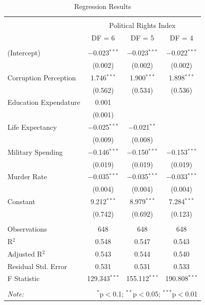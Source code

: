 \documentclass[
  english,
  man,floatsintext]{apa6}
\begin{document}
\begin{table}[!htbp] \centering 
  \caption{Regression Results} 
  \label{} 
\begin{tabular}{@{\extracolsep{5pt}}lccc} 
\\[-1.8ex]\hline 
\hline \\[-1.8ex] 
 & \multicolumn{3}{c}{Political Rights Index} \\ 
\cline{2-4} 
 & DF = 6 & DF = 5 & DF = 4 \\ 
\hline \\[-1.8ex] 
 (Intercept) & $-$0.023$^{***}$ & $-$0.023$^{***}$ & $-$0.022$^{***}$ \\ 
  & (0.002) & (0.002) & (0.002) \\ 
  Corruption Perception & 1.746$^{***}$ & 1.900$^{***}$ & 1.898$^{***}$ \\ 
  & (0.562) & (0.534) & (0.536) \\ 
  Education Expendature & 0.001 &  &  \\ 
  & (0.001) &  &  \\ 
  Life Expectancy & $-$0.025$^{***}$ & $-$0.021$^{**}$ &  \\ 
  & (0.009) & (0.008) &  \\ 
  Military Spending & $-$0.146$^{***}$ & $-$0.150$^{***}$ & $-$0.153$^{***}$ \\ 
  & (0.019) & (0.019) & (0.019) \\ 
  Murder Rate & $-$0.035$^{***}$ & $-$0.035$^{***}$ & $-$0.033$^{***}$ \\ 
  & (0.004) & (0.004) & (0.004) \\ 
  Constant & 9.212$^{***}$ & 8.979$^{***}$ & 7.284$^{***}$ \\ 
  & (0.742) & (0.692) & (0.123) \\ 
 \hline \\[-1.8ex] 
Observations & 648 & 648 & 648 \\ 
R$^{2}$ & 0.548 & 0.547 & 0.543 \\ 
Adjusted R$^{2}$ & 0.543 & 0.544 & 0.540 \\ 
Residual Std. Error & 0.531 & 0.531 & 0.533 \\ 
F Statistic & 129.343$^{***}$ & 155.112$^{***}$ & 190.808$^{***}$ \\ 
\hline 
\hline \\[-1.8ex] 
\textit{Note:}  & \multicolumn{3}{r}{$^{*}$p$<$0.1; $^{**}$p$<$0.05; $^{***}$p$<$0.01} \\ 
\end{tabular} 
\end{table}
\end{document}
